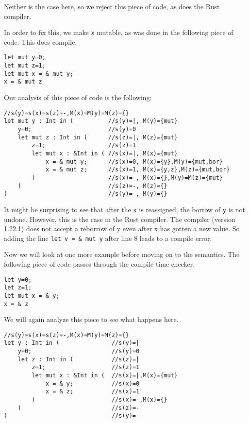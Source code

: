 Neither is the case here, so we reject this piece of code, as does the Rust compiler. 

In order to fix this, we make \texttt{x} mutable, as was done in the following piece of code. This does compile.

\begin{verbatim}
let mut y=0;
let mut z=1;
let mut x = & mut y; 
x = & mut z
\end{verbatim}

Our analysis of this piece of code is the following: 

\begin{verbatim}
//s(y)=s(x)=s(z)=-,M(x)=M(y)=M(z)={}
let mut y : Int in (          //s(y)=|, M(y)={mut}
    y=0;                      //s(y)=0
    let mut z : Int in (      //s(z)=|, M(z)={mut}
        z=1;                  //s(z)=1
        let mut x : &Int in ( //s(x)=|, M(x)={mut}
            x = & mut y;      //s(x)=0, M(x)={y},M(y)={mut,bor}
            x = & mut z;      //s(x)=1, M(x)={y,z},M(z)={mut,bor}
        )                     //s(x)=-, M(x)={},M(y)=M(z)={mut}
    )                         //s(z)=-, M(z)={}
)                             //s(y)=-, M(y)={}
\end{verbatim}

It might be surprising to see that after the \texttt{x} is reassigned, the borrow of \texttt{y} is not undone. However, this is the case in the Rust compiler. The compiler (version 1.22.1) does not accept a reborrow of y even after x has gotten a new value. So adding the line \texttt{let v = \& mut y} after line 8 leads to a compile error. 

Now we will look at one more example before moving on to the semantics. The following piece of code passes through the compile time checker.

\begin{verbatim}
let y=0;
let z=1;
let mut x = & y; 
x = & z
\end{verbatim}

We will again analyze this piece to see what happens here. 

\begin{verbatim}
//s(y)=s(x)=s(z)=-,M(x)=M(y)=M(z)={}
let y : Int in (               //s(y)=|
    y=0;                       //s(y)=0
    let z : Int in (           //s(z)=|
        z=1;                   //s(z)=1
        let mut x : &Int in (  //s(x)=|,M(x)={mut}
            x = & y;           //s(x)=0
            x = & z;           //s(x)=1
        )                      //s(x)=-,M(x)={}
    )                          //s(z)=-
)                              //s(y)=-
\end{verbatim}

